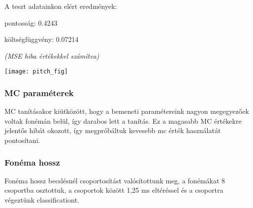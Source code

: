A teszt adatainkon elért eredmények:

pontosság: 0.4243

költségfüggvény: 0.07214

\textit{(MSE hiba értékekkel számítva)}

\texttt{[image: pitch\_fig]}
\subsubsection{MC paraméterek}
MC tanításakor kiütközött, hogy a bemeneti paramétereink nagyon megegyezőek voltak fonémán belül, így darabos lett a tanítás. Ez a magasabb MC értékekre jelentős hibát okozott, így megpróbáltuk kevesebb mc érték használatát pontosítani.
\subsubsection{Fonéma hossz}
Fonéma hossz becslésnél csoportosítást valósítottunk meg, a fonémákat 8 csoportba osztottuk, a csoportok között 1,25 ms eltéréssel és a csoportra végeztünk classificationt.